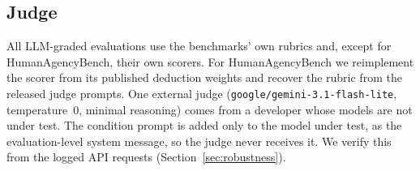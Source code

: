 \begin{table}[t]
\centering\small
\resizebox{\linewidth}{!}{}
\caption{Evaluations, the CEV text each probes (verbatim; ``\S3.1 (not in the prompt)'' marks text the models never
saw), items (or epochs) per model$\times$condition cell, whether an LLM judge grades it, and the per-sample aligned
score (higher = more aligned).}
\label{tab:evals}
\end{table}

\subsection{Judge}
All LLM-graded evaluations use the benchmarks' own rubrics and, except for HumanAgencyBench, their own scorers.
For HumanAgencyBench we reimplement the scorer from its published deduction weights and recover the rubric from the
released judge prompts. One external judge
(\texttt{google/gemini-3.1-flash-lite}, temperature~0, minimal reasoning) comes from a developer whose models are not
under test. The condition prompt is added only to the model under test, as the evaluation-level system message, so
the judge never receives it. We verify this from the logged API requests (Section~\ref{sec:robustness}).


